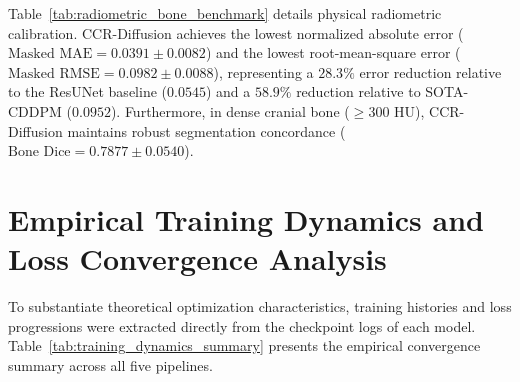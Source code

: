 \begin{table}[H]
\centering
\caption{Master Radiometric Accuracy, Physical Voxel Error, and Bone Geometry Benchmark}
\label{tab:radiometric_bone_benchmark}
\small
\renewcommand{\arraystretch}{1.25}
\end{table}

Table~\ref{tab:radiometric_bone_benchmark} details physical radiometric calibration. CCR-Diffusion achieves the lowest normalized absolute error ($\text{Masked MAE} = \mathbf{0.0391 \pm 0.0082}$) and the lowest root-mean-square error ($\text{Masked RMSE} = \mathbf{0.0982 \pm 0.0088}$), representing a $28.3\%$ error reduction relative to the ResUNet baseline ($0.0545$) and a $58.9\%$ reduction relative to SOTA-CDDPM ($0.0952$). Furthermore, in dense cranial bone ($\ge 300\text{ HU}$), CCR-Diffusion maintains robust segmentation concordance ($\text{Bone Dice} = 0.7877 \pm 0.0540$).

\section{Empirical Training Dynamics and Loss Convergence Analysis}
To substantiate theoretical optimization characteristics, training histories and loss progressions were extracted directly from the checkpoint logs of each model. Table~\ref{tab:training_dynamics_summary} presents the empirical convergence summary across all five pipelines.

